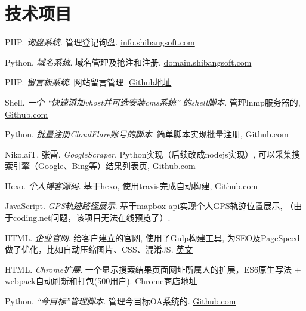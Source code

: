 \section{\textbf{技术项目}}
 \resumeSubHeadingListStart
   \item{
       PHP.
       \emph{询盘系统}.
       管理登记询盘. \href{http://info.shibangsoft.com}{info.shibangsoft.com}
   }
   \item{
       Python.
       \emph{域名系统}.
       域名管理及抢注和注册. \href{http://domain.shibangsoft.com}{domain.shibangsoft.com}
   }
   \item{
       PHP.
       \emph{留言板系统}.
       网站留言管理.  \href{https://github.com/leadscloud/inquiry}{Github地址}
   }
   \item{
       Shell.
       \emph{一个 ``快速添加vhost并可选安装cms系统'' 的shell脚本}.
       管理lnmp服务器的, \href{https://github.com/leadscloud/Tools}{Github.com}
   }
   \item{
       Python.
       \emph{批量注册CloudFlare账号的脚本}.
       简单脚本实现批量注册, \href{https://github.com/leadscloud/cloudflare}{Github.com}
   }
   \item{
       NikolaiT, 张雷.
       \emph{GoogleScraper}.
       Python实现（后续改成nodejs实现）, 可以采集搜索引擎（Google、Bing等）结果列表页, \href{https://github.com/NikolaiT/GoogleScraper/blob/master/AUTHORS}{Github.com}
   }
   \item{
       Hexo.
       \emph{个人博客源码}.
       基于hexo, 使用travis完成自动构建, \href{https://github.com/leadscloud/leadscloud.github.io/tree/source}{Github.com}
   }
   \item{
       JavaScript.
       \emph{GPS轨迹路径展示}.
       基于mapbox api实现个人GPS轨迹位置展示, （由于coding.net问题，该项目无法在线预览了）. %
   }
   \item{
       HTML.
       \emph{企业官网}.
       给客户建立的官网, 使用了Gulp构建工具, 为SEO及PageSpeed做了优化，比如自动压缩图片、CSS、混淆JS. \href{https://www.kamychina.com/}{英文}
   }
   \item{
       HTML.
       \emph{Chrome扩展}.
       一个显示搜索结果页面网址所属人的扩展，ES6原生写法 + webpack自动刷新和打包(500用户). \href{https://chrome.google.com/webstore/detail/ifbiiojnbgljbjffmacihhdkeomdkifc}{Chrome商店地址}
   }
   \item{
       Python.
       \emph{``今目标''管理脚本}.
       管理今目标OA系统的. \href{https://github.com/leadscloud/Jingoal}{Github.com}
   }
